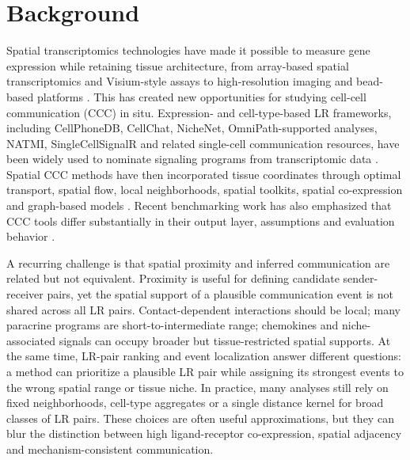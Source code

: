 \documentclass[referee,lineno,pdflatex,sn-vancouver-num]{sn-jnl}
\begin{document}

\maketitle

\section{Background}\label{sec:background}

Spatial transcriptomics technologies have made it possible to measure gene expression while retaining tissue architecture, from array-based spatial transcriptomics and Visium-style assays to high-resolution imaging and bead-based platforms \citep{stahl2016spatial,rodriques2019slideseq,stickels2021slideseqv2,vickovic2019hdst,chen2015merfish,eng2019seqfish,wang2018starmap,he2022cosmx}. This has created new opportunities for studying cell-cell communication (CCC) in situ. Expression- and cell-type-based LR frameworks, including CellPhoneDB, CellChat, NicheNet, OmniPath-supported analyses, NATMI, SingleCellSignalR and related single-cell communication resources, have been widely used to nominate signaling programs from transcriptomic data \citep{ventotormo2018maternal,cellphonedb2020,cellchat2021,nichenet2020,omnipath2021,natmi2020,ramilowski2015lr,armingol2021ccc,singlecellsignalr2020,ccccompare2022}. Spatial CCC methods have then incorporated tissue coordinates through optimal transport, spatial flow, local neighborhoods, spatial toolkits, spatial co-expression and graph-based models \citep{spaotsc2020,commot2023,spatalk2022,giotto2021,stlearn2020,squidpy2022,spatialdm2023,misty2022,holonet2023,cellnest2025,deeptalk2024,cytosignal2026}. Recent benchmarking work has also emphasized that CCC tools differ substantially in their output layer, assumptions and evaluation behavior \citep{ku2026benchmarking}.

A recurring challenge is that spatial proximity and inferred communication are related but not equivalent. Proximity is useful for defining candidate sender-receiver pairs, yet the spatial support of a plausible communication event is not shared across all LR pairs. Contact-dependent interactions should be local; many paracrine programs are short-to-intermediate range; chemokines and niche-associated signals can occupy broader but tissue-restricted spatial supports. At the same time, LR-pair ranking and event localization answer different questions: a method can prioritize a plausible LR pair while assigning its strongest events to the wrong spatial range or tissue niche. In practice, many analyses still rely on fixed neighborhoods, cell-type aggregates or a single distance kernel for broad classes of LR pairs. These choices are often useful approximations, but they can blur the distinction between high ligand-receptor co-expression, spatial adjacency and mechanism-consistent communication.
\end{document}
